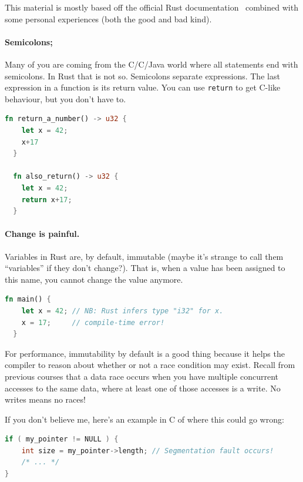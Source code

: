 \documentclass[a4paper]{report}
\newcommand{\CPP}{C\nolinebreak\hspace{-.05em}\raisebox{.4ex}{\tiny\bf +}\nolinebreak\hspace{-.10em}\raisebox{.4ex}{\tiny\bf +}}
\def\CPP{{C\nolinebreak[4]\hspace{-.05em}\raisebox{.4ex}{\tiny\bf ++}}}
\begin{document}
This material is mostly based off the official Rust documentation~\cite{rustdocs} combined with some personal experiences (both the good and bad kind). 

\paragraph{Semicolons;} Many of you are coming from the C/\CPP/Java world where all statements end with semicolons. In Rust that is
not so. Semicolons separate expressions. The last expression in a function is its return value. You can use \texttt{return} to get
C-like behaviour, but you don't have to.
\begin{lstlisting}[language=Rust]
  fn return_a_number() -> u32 {
    let x = 42;
    x+17
  }

  fn also_return() -> u32 {
    let x = 42;
    return x+17;
  }
\end{lstlisting}

\paragraph{Change is painful.}
Variables in Rust are, by default, immutable (maybe it's strange to call them ``variables'' if they don't change?). That is, when a value has been assigned to this name, you cannot change the value anymore.
\begin{lstlisting}[language=Rust]
  fn main() {
    let x = 42; // NB: Rust infers type "i32" for x.
    x = 17;     // compile-time error!
  }
\end{lstlisting}

For performance, immutability by default is a good thing because it helps the compiler to reason about whether or not a race condition may exist. Recall from previous courses that a data race occurs when you have multiple concurrent accesses to the same data, where at least one of those accesses is a write. No writes means no races! 

If you don't believe me, here's an example in C of where this could go wrong:
\begin{lstlisting}[language=C]
if ( my_pointer != NULL ) {
    int size = my_pointer->length; // Segmentation fault occurs!
    /* ... */
}
\end{lstlisting}
\end{document}
